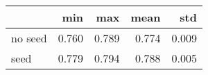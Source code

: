 \begin{tabular}{lrrrr}
\toprule
{} &    min &    max &   mean &    std \\
\midrule
no seed &  0.760 &  0.789 &  0.774 &  0.009 \\
seed    &  0.779 &  0.794 &  0.788 &  0.005 \\
\bottomrule
\end{tabular}
